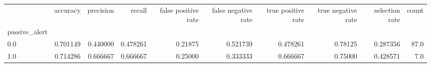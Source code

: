 \begin{tabular}{lrrrrrrrrr}
\toprule
{} &  accuracy &  precision &    recall &  false positive rate &  false negative rate &  true positive rate &  true negative rate &  selection rate &  count \\
passive\_alert &           &            &           &                      &                      &                     &                     &                 &        \\
\midrule
0.0           &  0.701149 &   0.440000 &  0.478261 &              0.21875 &             0.521739 &            0.478261 &             0.78125 &        0.287356 &   87.0 \\
1.0           &  0.714286 &   0.666667 &  0.666667 &              0.25000 &             0.333333 &            0.666667 &             0.75000 &        0.428571 &    7.0 \\
\bottomrule
\end{tabular}
